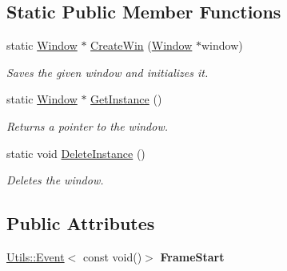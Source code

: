 \subsection*{Static Public Member Functions}
\begin{DoxyCompactItemize}
\item 
static \hyperlink{class_ensum_1_1_core_1_1_window}{Window} $\ast$ \hyperlink{class_ensum_1_1_core_1_1_window_af9478f4a6643763ba3be7a1a9fc98377}{Create\+Win} (\hyperlink{class_ensum_1_1_core_1_1_window}{Window} $\ast$window)\hypertarget{class_ensum_1_1_core_1_1_window_af9478f4a6643763ba3be7a1a9fc98377}{}\label{class_ensum_1_1_core_1_1_window_af9478f4a6643763ba3be7a1a9fc98377}

\begin{DoxyCompactList}\small\item\em Saves the given window and initializes it. \end{DoxyCompactList}\item 
static \hyperlink{class_ensum_1_1_core_1_1_window}{Window} $\ast$ \hyperlink{class_ensum_1_1_core_1_1_window_ada827fab647cc63b1c389f91f670bf18}{Get\+Instance} ()\hypertarget{class_ensum_1_1_core_1_1_window_ada827fab647cc63b1c389f91f670bf18}{}\label{class_ensum_1_1_core_1_1_window_ada827fab647cc63b1c389f91f670bf18}

\begin{DoxyCompactList}\small\item\em Returns a pointer to the window. \end{DoxyCompactList}\item 
static void \hyperlink{class_ensum_1_1_core_1_1_window_ac6e8b05158fca2587cdfe23dabf35baf}{Delete\+Instance} ()
\begin{DoxyCompactList}\small\item\em Deletes the window. \end{DoxyCompactList}\end{DoxyCompactItemize}
\subsection*{Public Attributes}
\begin{DoxyCompactItemize}
\item 
\hyperlink{class_ensum_1_1_utils_1_1_event}{Utils\+::\+Event}$<$ const void()$>$ {\bfseries Frame\+Start}\hypertarget{class_ensum_1_1_core_1_1_window_ad122b1a7fa3fdfcb351abbad2252dfe2}{}\label{class_ensum_1_1_core_1_1_window_ad122b1a7fa3fdfcb351abbad2252dfe2}

\end{DoxyCompactItemize}

